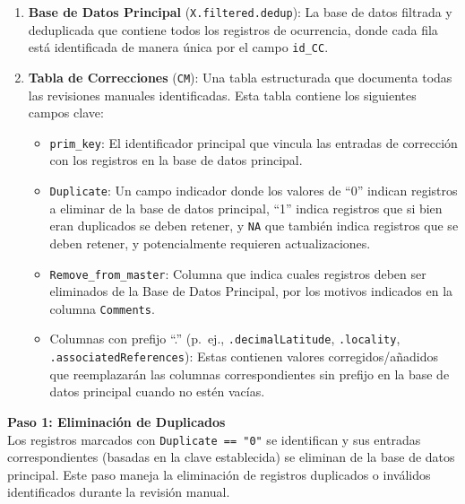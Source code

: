 \documentclass[sn-apa,pdflatex]{sn-jnl}
\providecommand{\tightlist}{%
  \setlength{\itemsep}{0pt}\setlength{\parskip}{0pt}}
\begin{document}
\begin{enumerate}
\def\labelenumi{\arabic{enumi}.}
\item
  \textbf{Base de Datos Principal} (\texttt{X.filtered.dedup}): La base
  de datos filtrada y deduplicada que contiene todos los registros de
  ocurrencia, donde cada fila está identificada de manera única por el
  campo \texttt{id\_CC}.
\item
  \textbf{Tabla de Correcciones} (\texttt{CM}): Una tabla estructurada
  que documenta todas las revisiones manuales identificadas. Esta tabla
  contiene los siguientes campos clave:

  \begin{itemize}
  \tightlist
  \item
    \texttt{prim\_key}: El identificador principal que vincula las
    entradas de corrección con los registros en la base de datos
    principal.\\
  \item
    \texttt{Duplicate}: Un campo indicador donde los valores de ``0''
    indican registros a eliminar de la base de datos principal, ``1''
    indica registros que si bien eran duplicados se deben retener, y
    \texttt{NA} que también indica registros que se deben retener, y
    potencialmente requieren actualizaciones.
  \item
    \texttt{Remove\_from\_master}: Columna que indica cuales registros
    deben ser eliminados de la Base de Datos Principal, por los motivos
    indicados en la columna \texttt{Comments}.
  \item
    Columnas con prefijo ``.'' (p.~ej., \texttt{.decimalLatitude},
    \texttt{.locality}, \texttt{.associatedReferences}): Estas contienen
    valores corregidos/añadidos que reemplazarán las columnas
    correspondientes sin prefijo en la base de datos principal cuando no
    estén vacías.
  \end{itemize}
\end{enumerate}

\textbf{Paso 1: Eliminación de Duplicados}\\
Los registros marcados con \texttt{Duplicate\ ==\ "0"} se identifican y
sus entradas correspondientes (basadas en la clave establecida) se
eliminan de la base de datos principal. Este paso maneja la eliminación
de registros duplicados o inválidos identificados durante la revisión
manual.
\end{document}
